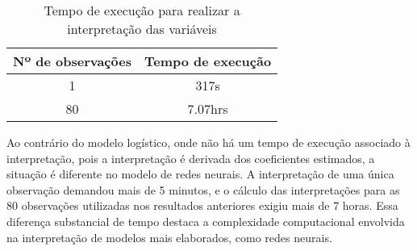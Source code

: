 \begin{table}[H]
\centering
\begin{tabular}{cc}
\hline
\textbf{Nº de observações} & \textbf{Tempo de execução} \\
\hline
1  & 317s \\
80 & 7.07hrs \\
\hline
\end{tabular}
\caption{Tempo de execução para realizar a interpretação das variáveis}
\label{tab:tempo_execucao_shap}
\end{table}
\newpage


Ao contrário do modelo logístico, onde não há um tempo de execução associado à interpretação, 
pois a interpretação é derivada dos coeficientes estimados, a situação é diferente no modelo de redes neurais. 
A interpretação de uma única observação demandou mais de 5 minutos, e o cálculo das interpretações para as 80
observações utilizadas nos resultados anteriores exigiu mais de 7 horas. Essa diferença substancial de tempo
destaca a complexidade computacional envolvida na interpretação de modelos mais elaborados, como redes neurais.

